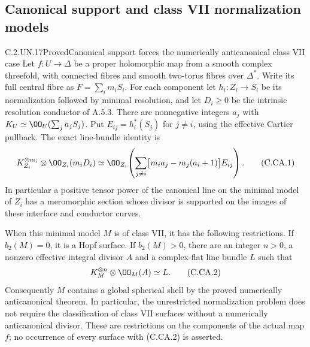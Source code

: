 \subsection{Canonical support and class VII normalization models}

\begin{statement}{C.2.UN.17}{Proved}{Canonical support forces the numerically anticanonical class VII case}
Let $f:U\to\Delta$ be a proper holomorphic map from a smooth
complex threefold, with connected fibres and smooth two-torus
fibres over $\Delta^*$. Write its full central fibre as
$F=\sum_i m_iS_i$. For each component let
$h_i:Z_i\to S_i$ be its normalization followed by minimal
resolution, and let $D_i\ge0$ be the intrinsic resolution
conductor of A.5.3. There are nonnegative integers $a_j$ with
$K_U\simeq\OO_U(\sum_j a_jS_j)$. Put
$E_{ij}=h_i^*(S_j)$ for $j\ne i$, using the effective
Cartier pullback. The exact line-bundle identity is
\[
 K_{Z_i}^{\otimes m_i}\otimes\OO_{Z_i}(m_iD_i)
 \simeq
 \OO_{Z_i}\!\left(
  \sum_{j\ne i}\bigl[m_i a_j-m_j(a_i+1)\bigr]E_{ij}
 \right).                                                \tag{C.CA.1}
\]
In particular a positive tensor power of the canonical line on the minimal
model of $Z_i$ has a meromorphic section whose divisor is
supported on the images of these interface and conductor
curves.

When this minimal model $M$ is of class VII, it has the
following restrictions. If $b_2(M)=0$, it is a Hopf surface.
If $b_2(M)>0$, there are an integer $n>0$, a nonzero
effective integral divisor $A$ and a complex-flat line
bundle $L$ such that
\[
                 K_M^{\otimes n}\otimes\OO_M(A)
                         \simeq L.                       \tag{C.CA.2}
\]
Consequently $M$ contains a global spherical shell by the
proved numerically anticanonical theorem. In particular,
the unrestricted normalization problem does not require
the classification of class VII surfaces without a
numerically anticanonical divisor. These are restrictions
on the components of the actual map $f$; no occurrence of
every surface with (C.CA.2) is asserted.
\end{statement}
